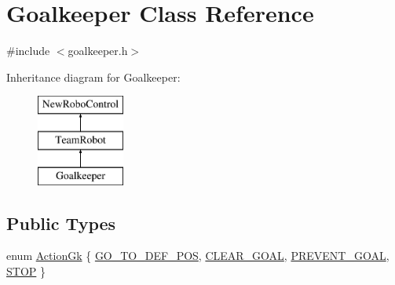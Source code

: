 \hypertarget{classGoalkeeper}{
\section{Goalkeeper Class Reference}
\label{classGoalkeeper}
}


{\ttfamily \#include $<$goalkeeper.h$>$}

Inheritance diagram for Goalkeeper:\begin{figure}[H]
\begin{center}
\leavevmode
\includegraphics[height=3cm]{classGoalkeeper}
\end{center}
\end{figure}
\subsection*{Public Types}
\begin{DoxyCompactItemize}
\item 
enum \hyperlink{classGoalkeeper_a25db0bed632b4bdb87532b0fbbf45855}{ActionGk} \{ \hyperlink{classGoalkeeper_a25db0bed632b4bdb87532b0fbbf45855af1fa8ff07676a5e27f9cc78f6811c704}{GO\_\-TO\_\-DEF\_\-POS}, 
\hyperlink{classGoalkeeper_a25db0bed632b4bdb87532b0fbbf45855a16f1efd31d6ead68306d343d85059ca2}{CLEAR\_\-GOAL}, 
\hyperlink{classGoalkeeper_a25db0bed632b4bdb87532b0fbbf45855a96b7bc8aa3f3a4d1b68955f8d757e9c1}{PREVENT\_\-GOAL}, 
\hyperlink{classGoalkeeper_a25db0bed632b4bdb87532b0fbbf45855a7940a4d0074c5f5bb33743797387c2c1}{STOP}
 \}
\end{DoxyCompactItemize}
